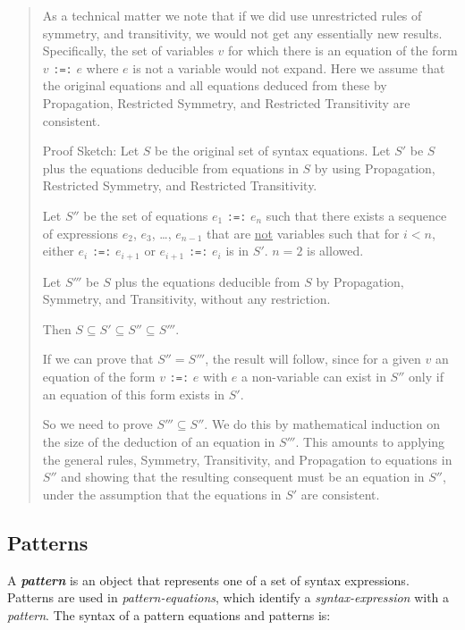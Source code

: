 \documentclass[12pt]{article}
\makeatletter
\newcommand{\emkey}[1]{{\bf \em #1}\index{#1@{\em #1}}}
\makeatother
\begin{document}
\begin{quote}

As a technical matter we note that if we did use unrestricted rules
of symmetry, and transitivity, we would not get any essentially new results.
Specifically, the set of variables $v$ for which there is an equation of the
form $v$ {\tt :=:} $e$ where $e$ is not a variable would not expand.  Here
we assume that the original equations and all equations deduced from
these by Propagation, Restricted Symmetry, and Restricted Transitivity are
consistent.

Proof Sketch: Let $S$ be the original set of syntax equations.  Let $S'$ be
$S$ plus the equations deducible from equations in $S$ by using Propagation,
Restricted Symmetry, and Restricted Transitivity.

Let $S''$ be the set of equations $e_1$ {\tt :=:} $e_n$
such that there exists a sequence of expressions $e_2$, $e_3$,
\ldots, $e_{n-1}$ that are \underline{not} variables such that for $i<n$,
either $e_i$ {\tt :=:} $e_{i+1}$
or $e_{i+1}$ {\tt :=:} $e_i$ is in $S'$.  $n=2$ is allowed.

Let $S'''$ be $S$ plus
the equations deducible from $S$ by Propagation, Symmetry,
and Transitivity, without any restriction.

Then $S\subseteq S'\subseteq S''\subseteq S'''$.

If we can prove that
$S''=S'''$, the result will follow, since for a given $v$ an equation
of the form $v$ {\tt :=:} $e$ with $e$ a non-variable can exist in $S''$ only
if an equation of this form exists in $S'$.

So we need to prove $S'''\subseteq S''$.  We do this by mathematical
induction on the size of the deduction of an equation in $S'''$.
This amounts to applying the general rules, Symmetry, Transitivity,
and Propagation to equations in $S''$ and showing that the resulting
consequent must be an equation in $S''$, under the assumption that the
equations in $S'$ are consistent.

\end{quote}

\subsection{Patterns}
\label{PATTERNS}
\label{PATTERN-EQUATIONS}

A \emkey{pattern} is an object that represents one of
a set of syntax expressions.  Patterns are used in
{\em pattern-equations}, which identify a {\em syntax-expression} with
a {\em pattern}.  The syntax of a pattern equations and patterns is:
\end{document}
